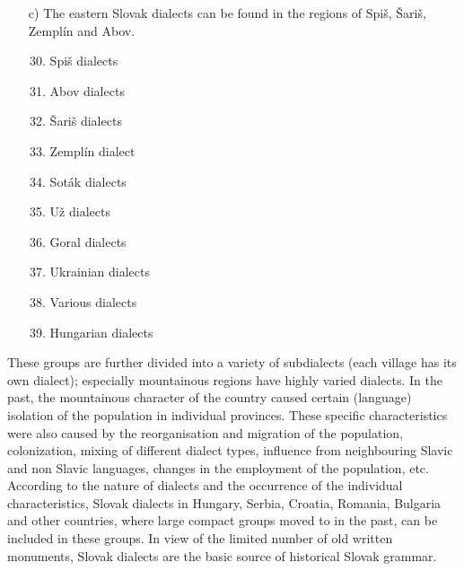\begin{itemize}
\item[c)] The eastern Slovak dialects can be found in the regions of Spiš, Šariš, Zemplín and Abov.

\begin{enumerate}
\setcounter{enumi}{29}
\item Spiš dialects
\item Abov dialects
\item Šariš dialects
\item Zemplín dialect
\item Soták dialects
\item Už dialects
\setcounter{enumi}{39}
\item Goral dialects
\item Ukrainian dialects
\item Various dialects
\item Hungarian dialects
\end{enumerate}
\end{itemize}

\medskip

These groups are further divided into a variety of subdialects (each village has its own dialect); especially mountainous regions have highly varied dialects. In the past, the mountainous character of the country caused certain (language) isolation of the population in individual provinces. These specific characteristics were also caused by the reorganisation and migration of the population, colonization, mixing of different dialect types, influence from neighbouring Slavic and non Slavic languages, changes in the employment of the population, etc. According to the nature of dialects and the occurrence of the individual characteristics, Slovak dialects in Hungary, Serbia, Croatia, Romania, Bulgaria and other countries, where large compact groups moved to in the past, can be included in these groups. In view of the limited number of old written monuments, Slovak dialects are the basic source of historical Slovak grammar.
